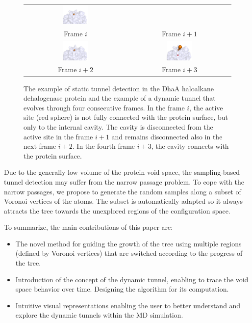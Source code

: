 \documentclass[usletter, 10pt, conference]{svjour3}      %
\begin{document}
\begin{figure}[t]
{\begin{tabular}{cc}
\includegraphics[width=0.26\textwidth]{fig/dt-f6} \\
Frame $i$ & Frame $i+1$ \\
\includegraphics[width=0.26\textwidth]{fig/dt-f7} &
\includegraphics[width=0.26\textwidth]{fig/dt-f8} \\
Frame $i+2$ & Frame $i+3$ \\
\end{tabular}
}
\caption{\label{fig::motiv}
The example of static tunnel detection in the DhaA haloalkane dehalogenase protein and the example of a dynamic tunnel that evolves through four consecutive frames.
In the frame $i$, the active site (red sphere) is not fully connected with the protein surface, but only to the internal cavity.
The cavity is disconnected from the active site in the frame $i+1$ and remains disconnected also in the next frame $i+2$.
In the fourth frame $i+3$, the cavity connects with the protein surface.
}
\end{figure}

Due to the generally low volume of the protein void space, the sampling-based tunnel detection may suffer from the narrow passage problem.
To cope with the narrow passages, we propose to generate the random samples along a subset of Voronoi vertices of the atoms.
The subset is automatically adapted so it always attracts the tree towards the unexplored regions of the configuration space.


To summarize, the main contributions of this paper are:
\begin{itemize}
\item The novel method for guiding the growth of the tree using multiple regions (defined by Voronoi vertices) that are switched according to the progress of the tree.
\item Introduction of the concept of the dynamic tunnel, enabling to trace the void space behavior over time. Designing the algorithm for its computation.
\item Intuitive visual representations enabling the user to better understand and explore the dynamic tunnels within the MD simulation.
\end{itemize}
\end{document}
